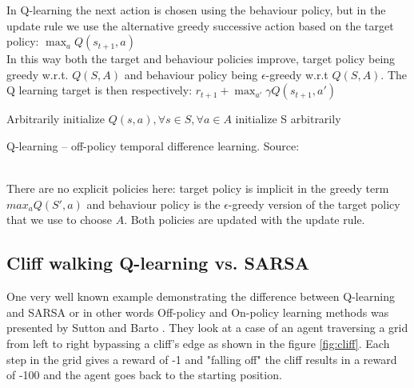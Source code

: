 
In Q-learning the  next action is chosen using the behaviour policy, but in the update rule we use the alternative greedy successive action based on the target policy: $\max_a Q(s_{t+1}, a)$\\

In this way both the target and behaviour policies improve, target policy being greedy w.r.t. $Q(S, A)$ and behaviour policy being $\epsilon$-greedy w.r.t $Q(S, A)$. The Q learning target is then respectively: $r_{t+1} + \max_{a'} \gamma Q(s_{t+1}, a')$\\


\begin{algorithm}[H]
\SetAlgoLined
Arbitrarily initialize $Q(s, a), \forall s \in S, \forall a \in A$\;
initialize S arbitrarily\;
\caption{Q-learning -- off-policy temporal difference learning. Source: \cite{lecture_mfc} }
\end{algorithm}\\


There are no explicit policies here: target policy is implicit in the greedy term $max_a Q(S', a)$ and behaviour policy is the $\epsilon$-greedy version of the target policy that we use to choose $A$. Both policies are updated with the update rule.

\subsection{Cliff walking  Q-learning vs. SARSA}
One very well known example demonstrating the difference between
Q-learning and SARSA or in other words Off-policy and On-policy learning methods was presented by Sutton and Barto \cite{sutton_barto}. They look at a case of an agent traversing a grid from left to right bypassing a cliff's edge as shown in the figure \ref{fig:cliff}. Each
step in the grid gives a reward of -1 and "falling off" 
the cliff results in a reward of -100 and the agent goes
back to the starting position.

